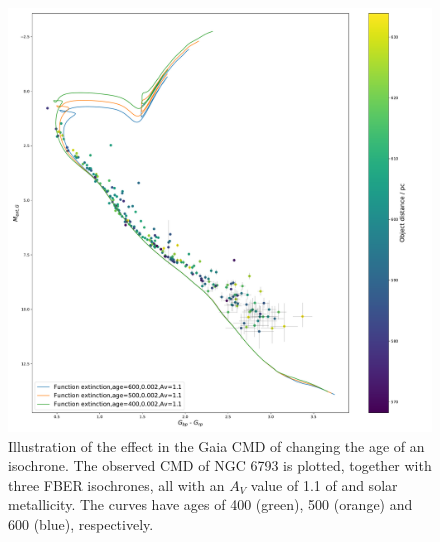 \documentclass[12pt, a4paper]{report}
\begin{document}
\begin{figure}[h!]
\begin{center}
\includegraphics[width=1.0\textwidth]{../NGC_6793_CMD_FeH_0p002_Av_1p1_600_500_400Myr_isochrones_func_errorbars_T5k.pdf}
\caption{Illustration of the effect in the Gaia CMD of changing the age of an isochrone. The observed CMD of NGC 6793 is plotted, together with three FBER isochrones, all with an $A_{V}$ value of 1.1 of and solar metallicity. The curves have ages of 400 (green), 500 (orange) and 600 (blue), respectively.}
\label{NGC_6793_age_var}
\end{center}
\end{figure}
\end{document}
